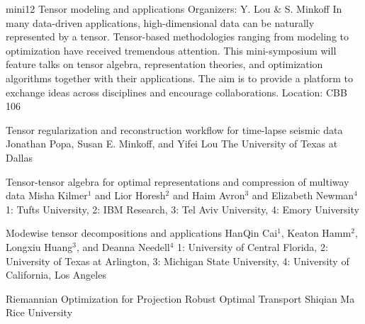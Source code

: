 \mini
{mini12}
{Tensor modeling and applications}
{Organizers: Y. Lou \& S. Minkoff}
{In many data-driven applications, high-dimensional data can be naturally represented by a tensor. Tensor-based methodologies ranging from modeling to optimization have received tremendous attention.  This mini-symposium will feature talks on tensor algebra, representation theories, and optimization algorithms together with their applications. The aim is to provide a platform to exchange ideas across disciplines and encourage collaborations.}
{Location: CBB 106}

\begin{talks}
\item\talk
{Tensor regularization and reconstruction workflow for time-lapse seismic data}
{Jonathan Popa, Susan E. Minkoff, and Yifei Lou}
{The University of Texas at Dallas}
\item\talk
{Tensor-tensor algebra for optimal representations and compression of multiway data}
{Misha Kilmer$^{1}$ and Lior Horesh$^{2}$ and Haim Avron$^{3}$ and Elizabeth Newman$^{4}$}
{1: Tufts University, 2: IBM Research, 3: Tel Aviv University, 4: Emory University}
\item\talk
{Modewise tensor decompositions and applications}
{HanQin Cai$^{1}$, Keaton Hamm$^{2}$, Longxiu Huang$^{3}$, and Deanna Needell$^{4}$}
{1: University of Central Florida, 2: University of Texas at Arlington, 3: Michigan State University, 4: University of California, Los Angeles}
\item\talk
{Riemannian Optimization for Projection Robust Optimal Transport}
{Shiqian Ma}
{Rice University}
\end{talks}
\room
